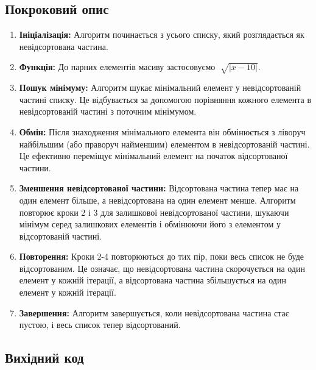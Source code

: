 \documentclass[12pt]{extarticle}
\begin{document}
\subsection*{Покроковий опис}

\begin{enumerate}

\item \textbf{Ініціалізація:} Алгоритм починається з усього списку, 
який розглядається як невідсортована частина.

\item \textbf{Функція:} До парних елементів масиву застосовуємо $\sqrt[]{|x -10|}$.

\item \textbf{Пошук мінімуму:} Алгоритм шукає мінімальний елемент у 
невідсортованій частині списку. Це відбувається за допомогою
 порівняння кожного елемента в невідсортованій частині з поточним
  мінімумом.

\item \textbf{Обмін:} Після знаходження мінімального елемента він обмінюється з 
ліворуч найбільшим (або праворуч найменшим) елементом в
 невідсортованій частині. Це ефективно переміщує мінімальний елемент
  на початок відсортованої частини.

\item \textbf{Зменшення невідсортованої частини:} Відсортована частина 
тепер має на один елемент більше, а невідсортована на один елемент менше.
 Алгоритм повторює кроки 2 і 3 для залишкової невідсортованої частини,
  шукаючи мінімум серед залишкових елементів і обмінюючи його з елементом
   у відсортованій частині.

\item \textbf{Повторення:} Кроки 2-4 повторюються до тих пір, поки весь список не
 буде відсортованим. Це означає, що невідсортована частина скорочується
  на один елемент у кожній ітерації, а відсортована частина збільшується
   на один елемент у кожній ітерації.

\item \textbf{Завершення:} Алгоритм завершується, коли невідсортована частина стає 
пустою, і весь список тепер відсортований.

\end{enumerate}

\subsection*{Вихідний код}
\end{document}
